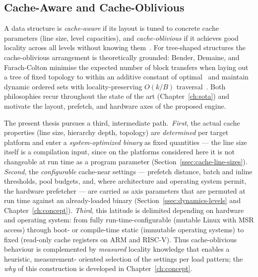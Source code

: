 \subsection{Cache-Aware and Cache-Oblivious}\label{ssec:aware-oblivious}
A data structure is \emph{cache-aware} if its layout is tuned to concrete cache parameters (line
size, level capacities), and \emph{cache-oblivious} if it achieves good locality across all levels
without knowing them~\cite{frigo1999cache}. For tree-shaped structures the cache-oblivious
arrangement is theoretically grounded: Bender, Demaine, and Farach-Colton minimise the expected
number of block transfers when laying out a tree of fixed topology to within an additive constant of
optimal~\cite{bender2002treelayout} and maintain dynamic ordered sets with locality-preserving
$O(k/B)$ traversal~\cite{bender2002scanning}. Both philosophies recur throughout the state of the
art (Chapter~\ref{ch:sota}) and motivate the layout, prefetch, and hardware axes of the proposed
engine.

The present thesis pursues a third, intermediate path.\ \emph{First}, the actual cache properties
(line size, hierarchy depth, topology) are \emph{determined} per target platform and enter a
\emph{system-optimized binary} as fixed quantities --- the line size itself is a compilation input,
since on the platforms considered here it is not changeable at run time as a program parameter
(Section~\ref{ssec:cache-line-sizes})\@. \emph{Second}, the \emph{configurable} cache-near settings
--- prefetch distance, batch and inline thresholds, pool budgets, and, where architecture and
operating system permit, the hardware prefetcher --- are carried as axis parameters that are
permuted at run time against an already-loaded binary (Section~\ref{ssec:dynamics-levels} and
Chapter~\ref{ch:concept})\@. \emph{Third}, this latitude is delimited depending on hardware and
operating system: from fully run-time-configurable (mutable Linux with MSR access) through boot- or
compile-time static (immutable operating systems) to fixed (read-only cache registers on ARM and
RISC-V). Thus cache-oblivious behaviour is complemented by \emph{measured} locality knowledge that
enables a heuristic, measurement- oriented selection of the settings per load pattern; the
\emph{why} of this construction is developed in Chapter~\ref{ch:concept}.

